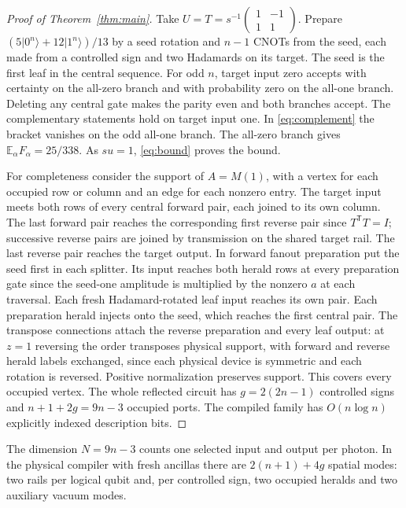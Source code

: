 \documentclass[11pt]{article}
\newcommand{\E}{\mathbb E}
\newcommand{\ket}[1]{\lvert #1\rangle}
\begin{document}
\begin{proof}[Proof of Theorem~\ref{thm:main}]
Take \(U=T=s^{-1}\left(\begin{smallmatrix}1&-1\\1&1\end{smallmatrix}\right)\). Prepare \((5\ket{0^n}+12\ket{1^n})/13\) by a seed rotation and \(n-1\) CNOTs from the seed, each made from a controlled sign and two Hadamards on its target. The seed is the first leaf in the central sequence. For odd \(n\), target input zero accepts with certainty on the all-zero branch and with probability zero on the all-one branch. Deleting any central gate makes the parity even and both branches accept. The complementary statements hold on target input one. In \eqref{eq:complement} the bracket vanishes on the odd all-one branch. The all-zero branch gives \(\E_\alpha F_\alpha=25/338\). As \(su=1\), \eqref{eq:bound} proves the bound.

For completeness consider the support of \(A=M(1)\), with a vertex for each occupied row or column and an edge for each nonzero entry. The target input meets both rows of every central forward pair, each joined to its own column. The last forward pair reaches the corresponding first reverse pair since \(T^\mathsf TT=I\); successive reverse pairs are joined by transmission on the shared target rail. The last reverse pair reaches the target output. In forward fanout preparation put the seed first in each splitter. Its input reaches both herald rows at every preparation gate since the seed-one amplitude is multiplied by the nonzero \(a\) at each traversal. Each fresh Hadamard-rotated leaf input reaches its own pair. Each preparation herald injects onto the seed, which reaches the first central pair. The transpose connections attach the reverse preparation and every leaf output: at \(z=1\) reversing the order transposes physical support, with forward and reverse herald labels exchanged, since each physical device is symmetric and each rotation is reversed. Positive normalization preserves support. This covers every occupied vertex. The whole reflected circuit has \(g=2(2n-1)\) controlled signs and \(n+1+2g=9n-3\) occupied ports. The compiled family has \(O(n\log n)\) explicitly indexed description bits.
\end{proof}

The dimension \(N=9n-3\) counts one selected input and output per photon. In the physical compiler with fresh ancillas there are \(2(n+1)+4g\) spatial modes: two rails per logical qubit and, per controlled sign, two occupied heralds and two auxiliary vacuum modes.
\end{document}
